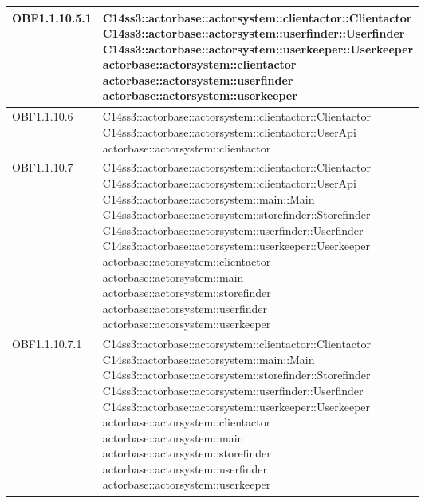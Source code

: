 \documentclass{scalatekids-article}
\begin{document}
\begin{longtable}[H]{|p{4.5cm}|p{13cm}|}
\hline
OBF1.1.10.5.1 & \multiLineCell[t]{C14ss3::actorbase::actorsystem::clientactor::Clientactor\\C14ss3::actorbase::actorsystem::userfinder::Userfinder\\C14ss3::actorbase::actorsystem::userkeeper::Userkeeper\\actorbase::actorsystem::clientactor\\actorbase::actorsystem::userfinder\\actorbase::actorsystem::userkeeper\\}\\
\hline
OBF1.1.10.6 & \multiLineCell[t]{C14ss3::actorbase::actorsystem::clientactor::Clientactor\\C14ss3::actorbase::actorsystem::clientactor::UserApi\\actorbase::actorsystem::clientactor\\}\\
\hline
OBF1.1.10.7 & \multiLineCell[t]{C14ss3::actorbase::actorsystem::clientactor::Clientactor\\C14ss3::actorbase::actorsystem::clientactor::UserApi\\C14ss3::actorbase::actorsystem::main::Main\\C14ss3::actorbase::actorsystem::storefinder::Storefinder\\C14ss3::actorbase::actorsystem::userfinder::Userfinder\\C14ss3::actorbase::actorsystem::userkeeper::Userkeeper\\actorbase::actorsystem::clientactor\\actorbase::actorsystem::main\\actorbase::actorsystem::storefinder\\actorbase::actorsystem::userfinder\\actorbase::actorsystem::userkeeper\\}\\
\hline
OBF1.1.10.7.1 & \multiLineCell[t]{C14ss3::actorbase::actorsystem::clientactor::Clientactor\\C14ss3::actorbase::actorsystem::main::Main\\C14ss3::actorbase::actorsystem::storefinder::Storefinder\\C14ss3::actorbase::actorsystem::userfinder::Userfinder\\C14ss3::actorbase::actorsystem::userkeeper::Userkeeper\\actorbase::actorsystem::clientactor\\actorbase::actorsystem::main\\actorbase::actorsystem::storefinder\\actorbase::actorsystem::userfinder\\actorbase::actorsystem::userkeeper\\}\\

\end{longtable}
\end{document}
